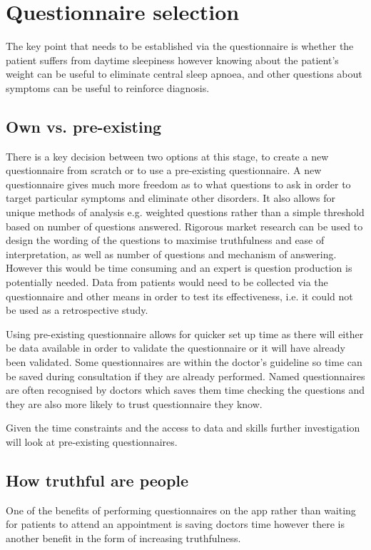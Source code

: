 \section{Questionnaire selection}
\label{sec:questionnaire-sophie}
The key point that needs to be established via the questionnaire is whether the patient suffers from daytime sleepiness however knowing about the patient’s weight can be useful to eliminate central sleep apnoea, and other questions about symptoms can be useful to reinforce diagnosis. 

\subsection{Own vs. pre-existing}
 There is a key decision between two options at this stage, to create a new questionnaire from scratch or to use a pre-existing questionnaire. A new questionnaire gives much more freedom as to what questions to ask in order to target particular symptoms and eliminate other disorders. It also allows for unique methods of analysis e.g. weighted questions rather than a simple threshold based on number of questions answered. Rigorous market research can be used to design the wording of the questions to maximise truthfulness and ease of interpretation, as well as number of questions and mechanism of answering. However this would be time consuming and an expert is question production is potentially needed. Data from patients would need to be collected via the questionnaire and other means in order to test its effectiveness, i.e. it could not be used as a retrospective study.

Using pre-existing questionnaire allows for quicker set up time as there will either be data available in order to validate the questionnaire or it will have already been validated. Some questionnaires are within the doctor’s guideline so time can be saved during consultation if they are already performed. Named questionnaires are often recognised by doctors which saves them time checking the questions and they are also more likely to trust questionnaire they know. 

Given the time constraints and the access to data and skills further investigation will look at pre-existing questionnaires. 
\subsection{How truthful are people}
One of the benefits of performing questionnaires on the app rather than waiting for patients to attend an appointment is saving doctors time however there is another benefit in the form of increasing truthfulness. 

